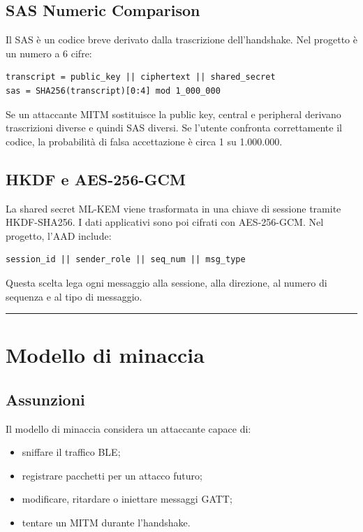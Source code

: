 \documentclass[11pt,a4paper]{article}
\providecommand{\tightlist}{\setlength{\itemsep}{0pt}\setlength{\parskip}{0pt}}
\begin{document}
\subsection{SAS Numeric Comparison}\label{sas-numeric-comparison}

Il SAS è un codice breve derivato dalla trascrizione dell'handshake. Nel
progetto è un numero a 6 cifre:

\begin{lstlisting}
transcript = public_key || ciphertext || shared_secret
sas = SHA256(transcript)[0:4] mod 1_000_000
\end{lstlisting}

Se un attaccante MITM sostituisce la public key, central e peripheral
derivano trascrizioni diverse e quindi SAS diversi. Se l'utente
confronta correttamente il codice, la probabilità di falsa accettazione
è circa 1 su 1.000.000.

\subsection{HKDF e AES-256-GCM}\label{hkdf-e-aes-256-gcm}

La shared secret ML-KEM viene trasformata in una chiave di sessione
tramite HKDF-SHA256. I dati applicativi sono poi cifrati con
AES-256-GCM. Nel progetto, l'AAD include:

\begin{lstlisting}
session_id || sender_role || seq_num || msg_type
\end{lstlisting}

Questa scelta lega ogni messaggio alla sessione, alla direzione, al
numero di sequenza e al tipo di messaggio.

\begin{center}\rule{0.5\linewidth}{0.5pt}\end{center}

\section{Modello di minaccia}\label{capitolo-3---modello-di-minaccia}

\subsection{Assunzioni}\label{assunzioni}

Il modello di minaccia considera un attaccante capace di:

\begin{itemize}
\tightlist
\item
  sniffare il traffico BLE;
\item
  registrare pacchetti per un attacco futuro;
\item
  modificare, ritardare o iniettare messaggi GATT;
\item
  tentare un MITM durante l'handshake.
\end{itemize}
\end{document}
